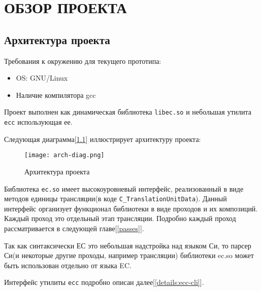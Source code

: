 \chapter{ОБЗОР ПРОЕКТА}
\label{ch:ch1}


\section{Архитектура проекта}

Требования к окружению для текущего прототипа:
\begin{itemize}
\item OS: GNU/Linux
\item Наличие компилятора gcc
\end{itemize}

\vspace{5pt}
Проект выполнен как динамическая библиотека \verb|libec.so| и небольшая утилита \verb|ecc| использующая ее.

Следующая диаграмма[\ref{arch:diag}] иллюстрирует архитектуру проекта:

\begin{figure}[h!]
    \texttt{[image: arch-diag.png]}
    \centering
    \caption{Архитектура проекта}
    \label{arch:diag}
\end{figure}

Библиотека \verb|ec.so| имеет высокоуровневый интерфейс, реализованный в виде методов единицы трансляции(в коде \verb|C_TranslationUnitData|).
Данный интерфейс организует функционал библиотеки в виде проходов и их композиций.
Каждый проход это отдельный этап трансляции. 
Подробно каждый проход рассматривается в следующей главе[\ref{passes}].

Так как синтаксически ЕС это небольшая надстройка над языком Си, 
то парсер Си(и некоторые другие проходы, например трансляции) библиотеки ec.so может быть использован отдельно от языка EC.

Интерфейс утилиты \verb|ecc| подробно описан далее[\ref{details:ecc-cli}].




